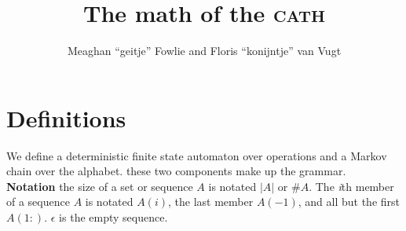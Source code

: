 \documentclass[12pt]{article}
\title{The math of the \textsc{cath}}
\author{Meaghan ``geitje'' Fowlie and Floris ``konijntje'' van Vugt}
\theoremstyle{definition}
\begin{document}
\maketitle

\section{Definitions}



\newcommand\STATES{\ensuremath{\mathbb{S}}\xspace}
\newcommand\OPS{\ensuremath{\mathbb{O}}\xspace}
\newcommand\BIGR{\ensuremath{\mathbb{B}}\xspace}
\newcommand\FSA{\textsc{FSA}\xspace}
\newcommand\PARSES{\ensuremath{\mathbb{P}}}
\newcommand\SC{\text{\textsc{sc}}}
\newcommand\TC{\text{\textsc{tc}}}
\newcommand\UC{\text{\textsc{uc}}}
\newcommand\BC{\text{\textsc{bc}}}
\newcommand\N{\ensuremath{\mathbb{N}}}
\newcommand\sg{\ensuremath{\Sigma}\xspace}
\newcommand\la{\ensuremath{\langle}\xspace}
\newcommand\ra{\ensuremath{\rangle}\xspace}
\newcommand\arr{\ensuremath{\rightarrow}\xspace}
\newcommand\emp{\ensuremath{\epsilon}\xspace}

\newcommand\op{\text{\textsl{op}}\xspace}
\newcommand\mg{\text{\textsl{mg}}\xspace}
\newcommand\cp{\text{\textsl{copy}}\xspace}
\newcommand\cl{\text{\textsl{clear}}\xspace}
\newcommand\ed{\text{\textsl{end}}\xspace}
\newcommand\start{\text{\textsl{start}}\xspace}

\newcommand\expr{\text{\textsl{expr}}\xspace}
\newcommand\Lex{\text{\textsl{Lex}}\xspace}
\newcommand\fea[1]{\text{\texttt{#1}}\xspace}
\newcommand\LBOUND{\ensuremath{\rtimes}}
\newcommand\RBOUND{\ensuremath{\ltimes}}
\newcommand\OURG{\text{\textsc{cath}}\xspace}


\newcommand\llb{\ensuremath{\llbracket}}
\newcommand\rrb{\ensuremath{\rrbracket}}

\newcommand\IF{\text{ if }\xspace}
\newcommand\der{\leftarrow}


We define a deterministic finite state automaton over operations and a Markov chain over the alphabet. these two components make up the grammar. \\

\noindent\textbf{Notation} the size of a set or sequence $A$ is notated $|A|$ or $\#A$. The \textit{i}th member of a sequence $A$ is notated $A(i)$, the last member $A(-1)$, and all but the first $A(1:)$. $\emp$ is the empty sequence.
\end{document}
